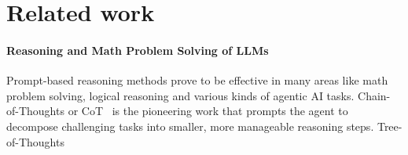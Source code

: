 









\section{Related work}
\paragraph{Reasoning and Math Problem Solving of LLMs}
Prompt-based reasoning methods prove to be effective in many areas like math problem solving, logical reasoning and various kinds of agentic AI tasks. Chain-of-Thoughts or CoT~\citep{wei2022chain} is the pioneering work that prompts the agent to decompose challenging tasks into smaller, more manageable reasoning steps. Tree-of-Thoughts~\citep{yao2024tree}

